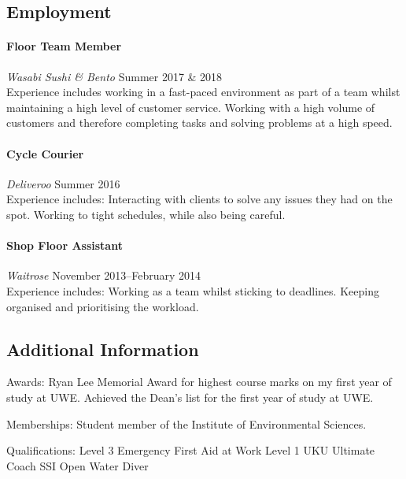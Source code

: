 \documentclass[11pt,a4paper]{article}
\newcommand{\centry}[3]{\paragraph{#1} \textit{#2}%
\hfill#3\\[2pt]}
\begin{document}
\subsection*{Employment}

\centry{Floor Team Member}{Wasabi Sushi & Bento}{Summer 2017 & 2018}

Experience includes working in a fast-paced environment as part of a team whilst 
maintaining a high level of customer service. Working with a high volume of 
customers and therefore completing tasks and solving problems at a high speed. 

\centry{Cycle Courier}{Deliveroo}{Summer 2016}

Experience includes: Interacting with clients to solve any issues they had on 
the spot. Working to tight schedules, while also being careful. 


\centry{Shop Floor Assistant}{Waitrose}{November 2013--February 2014}

Experience includes: Working as a team whilst sticking to deadlines. 
Keeping organised and prioritising the workload.



\subsection*{Additional Information}

Awards: Ryan Lee Memorial Award for highest course marks on my first year of study at UWE. 
        Achieved the Dean’s list for the first year of study at UWE. 
        
Memberships: Student member of the Institute of Environmental Sciences.

Qualifications: Level 3 Emergency First Aid at Work
                Level 1 UKU Ultimate Coach
                SSI Open Water Diver
\end{document}

